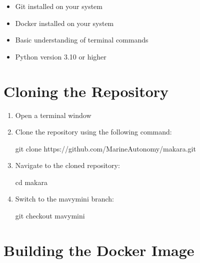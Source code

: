 \documentclass[
  letterpaper,
  DIV=11,
  numbers=noendperiod]{scrreprt}
\newenvironment{Shaded}{\begin{snugshade}}{\end{snugshade}}
\newcommand{\BuiltInTok}[1]{\textcolor[rgb]{0.00,0.23,0.31}{#1}}
\newcommand{\FunctionTok}[1]{\textcolor[rgb]{0.28,0.35,0.67}{#1}}
\newcommand{\NormalTok}[1]{\textcolor[rgb]{0.00,0.23,0.31}{#1}}
\providecommand{\tightlist}{%
  \setlength{\itemsep}{0pt}\setlength{\parskip}{0pt}}\usepackage{longtable,booktabs,array}
\begin{document}
\begin{itemize}
\tightlist
\item
  Git installed on your system
\item
  Docker installed on your system
\item
  Basic understanding of terminal commands
\item
  Python version 3.10 or higher
\end{itemize}

\section*{Cloning the Repository}\label{cloning-the-repository}


\begin{enumerate}
\def\labelenumi{\arabic{enumi}.}
\item
  Open a terminal window
\item
  Clone the repository using the following command:

\begin{Shaded}
\begin{Highlighting}[]
\FunctionTok{git}\NormalTok{ clone https://github.com/MarineAutonomy/makara.git}
\end{Highlighting}
\end{Shaded}
\item
  Navigate to the cloned repository:

\begin{Shaded}
\begin{Highlighting}[]
\BuiltInTok{cd}\NormalTok{ makara}
\end{Highlighting}
\end{Shaded}
\item
  Switch to the mavymini branch:

\begin{Shaded}
\begin{Highlighting}[]
\FunctionTok{git}\NormalTok{ checkout mavymini}
\end{Highlighting}
\end{Shaded}
\end{enumerate}

\section*{Building the Docker Image}\label{building-the-docker-image}
\end{document}
